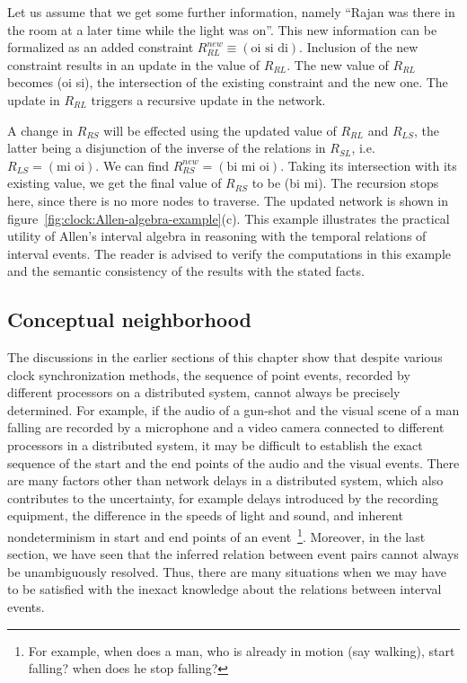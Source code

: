 Let us assume that we get some further information, namely ``Rajan was there in the room at a later time while the light was 
on''. This new information can be formalized as an added constraint $R^{new}_{RL} \equiv (\text{oi si di})$. Inclusion
of the new constraint results in an update in the value of $R_{RL}$. The new value of $R_{RL}$ becomes (oi si), the intersection of the 
existing constraint and the new one. The update in $R_{RL}$ triggers a recursive update in the network. 
 
A change in $R_{RS}$ will be effected using the updated value of $R_{RL}$ and $R_{LS}$, the latter being a disjunction of 
the inverse of the relations in $R_{SL}$, i.e. $R_{LS} = (\text{mi oi})$. We can find $R^{new}_{RS} = (\text{bi mi oi})$. 
Taking its intersection with its existing value, we get the final value of $R_{RS}$ to be (bi mi). The recursion stops here, 
since there is no more nodes to traverse.  The updated network is shown in figure~\ref{fig:clock:Allen-algebra-example}(c). 
% 
This example illustrates the practical utility of Allen's interval algebra in reasoning with the temporal relations
of interval events. The reader is advised to verify the computations in this example and the semantic consistency of the 
results with the stated facts.

\subsection{Conceptual neighborhood}

The discussions in the earlier sections of this chapter show that despite various clock synchronization methods, the sequence of 
point events, recorded by different processors on a distributed system, cannot always be precisely determined. For example, if the 
audio of a gun-shot and the visual scene of a man falling are recorded by a microphone and a video camera connected to different 
processors in a distributed system, it may be difficult to establish the exact sequence of the start and the end points of the 
audio and the visual events. There are many factors other than network delays in a distributed system, which also contributes to 
the uncertainty, for example delays introduced by the recording equipment, the difference in the speeds of light and sound, 
and inherent nondeterminism in start and end points of an event~\footnote{For example, when does a man, who is already in motion 
(say walking), start falling? when does he stop falling?}. Moreover, in the last section, we have seen that the inferred relation 
between event pairs cannot always be unambiguously resolved. Thus, there are many situations when we may have to be satisfied with 
the inexact knowledge about the relations between interval events.

